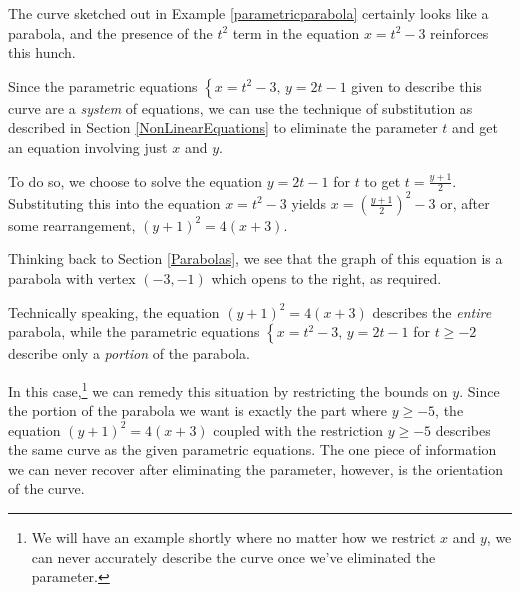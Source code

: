 \documentclass{ximera}
\begin{document}
\begin{example}
\begin{image}
\end{image}

\end{example}

The curve sketched out in Example \ref{parametricparabola} certainly looks like a parabola, and the presence of the $t^2$ term in the equation $x=t^2-3$ reinforces this hunch.  

Since the parametric equations $\left\{ x = t^2 - 3, \, y = 2t-1 \right.$ given to describe this curve are a \textit{system} of equations, we can use the technique of substitution as described in Section \ref{NonLinearEquations} to eliminate the parameter $t$ and get an equation involving just $x$ and $y$.  

 

To do so, we choose to solve the equation $y = 2t-1$ for $t$ to get $t = \frac{y+1}{2}$.  Substituting this into the equation $x = t^2 -3$ yields $x = \left(\frac{y+1}{2}\right)^2 - 3$ or, after some rearrangement, $(y+1)^2 = 4(x+3)$. 

 

Thinking back to Section \ref{Parabolas}, we see that the graph of this equation is a parabola with vertex $(-3,-1)$ which opens to the right, as required. 

 

Technically speaking, the equation $(y+1)^2 = 4(x+3)$ describes the \textit{entire} parabola, while the parametric equations $\left\{ x = t^2 - 3, \, y = 2t-1 \right.$ for $t \geq -2$ describe only a \textit{portion} of the parabola.  

 

In this case,\footnote{We will have an example shortly where no matter how we restrict $x$ and $y$, we can never accurately describe the curve once we've eliminated the parameter.} we can remedy this situation by restricting the bounds on $y$.  Since the portion of the parabola we want is exactly the part where $y \geq -5$, the equation $(y+1)^2 = 4(x+3)$ coupled with the restriction $y \geq -5$ describes the same curve as the given parametric equations.  The one piece of information we can never recover after eliminating the parameter, however,  is the orientation of the curve.
\end{document}
